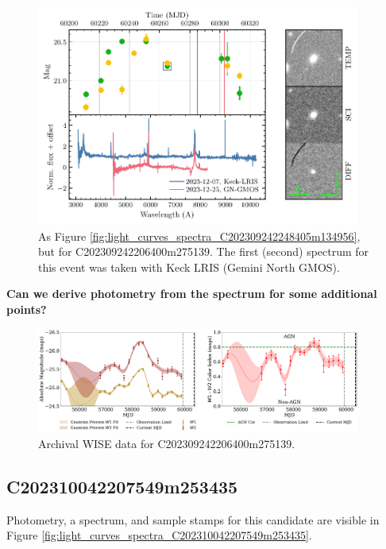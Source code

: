 \documentclass[twocolumn]{aastex631}
\newcommand{\todo}[1]{\textbf{\color{red} #1}}
\begin{document}
\begin{figure}
    \centering
    \includegraphics[width=0.95\textwidth]{figures/light_curves_spectra_15_C202309242206400m275139.pdf}
    \caption{
        As Figure \ref{fig:light_curves_spectra_C202309242248405m134956}, but for C202309242206400m275139.
        The first (second) spectrum for this event was taken with Keck LRIS (Gemini North GMOS).
    }
    \label{fig:light_curves_spectra_C202309242206400m275139}
\end{figure}

\todo{Can we derive photometry from the spectrum for some additional points?}

\begin{figure}
    \centering
    \includegraphics[width=0.95\textwidth]{figures/AT 2023aagj_MIR_Evolution.pdf}
    \caption{
        Archival WISE data for C202309242206400m275139.
    }
    \label{fig:WISE_C202309242206400m275139}
\end{figure}

\subsection{C202310042207549m253435}

Photometry, a spectrum, and sample stamps for this candidate are visible in Figure \ref{fig:light_curves_spectra_C202310042207549m253435}.
\end{document}
